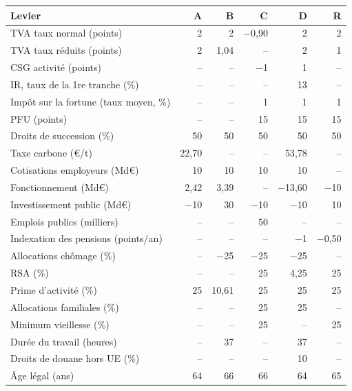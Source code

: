 \begin{tabular}{lrrrrr}
\toprule
Levier & A & B & C & D & R \\
\midrule
TVA taux normal (points) & 2 & 2 & $-$0{,}90 & 2 & 2 \\
TVA taux réduits (points) & 2 & 1{,}04 & -- & 2 & 1 \\
CSG activité (points) & -- & -- & $-$1 & 1 & -- \\
IR, taux de la 1re tranche (\%) & -- & -- & -- & 13 & -- \\
Impôt sur la fortune (taux moyen, \%) & -- & -- & 1 & 1 & 1 \\
PFU (points) & -- & -- & 15 & 15 & 15 \\
Droits de succession (\%) & 50 & 50 & 50 & 50 & 50 \\
Taxe carbone (€/t) & 22{,}70 & -- & -- & 53{,}78 & -- \\
Cotisations employeurs (Md€) & 10 & 10 & 10 & 10 & -- \\
Fonctionnement (Md€) & 2{,}42 & 3{,}39 & -- & $-$13{,}60 & $-$10 \\
Investissement public (Md€) & $-$10 & 30 & $-$10 & $-$10 & 10 \\
Emplois publics (milliers) & -- & -- & 50 & -- & -- \\
Indexation des pensions (points/an) & -- & -- & -- & $-$1 & $-$0{,}50 \\
Allocations chômage (\%) & -- & $-$25 & $-$25 & $-$25 & -- \\
RSA (\%) & -- & -- & 25 & 4{,}25 & 25 \\
Prime d'activité (\%) & 25 & 10{,}61 & 25 & 25 & 25 \\
Allocations familiales (\%) & -- & -- & 25 & 25 & -- \\
Minimum vieillesse (\%) & -- & -- & 25 & -- & 25 \\
Durée du travail (heures) & -- & 37 & -- & 37 & -- \\
Droits de douane hors UE (\%) & -- & -- & -- & 10 & -- \\
Âge légal (ans) & 64 & 66 & 66 & 64 & 65 \\
\bottomrule
\end{tabular}
